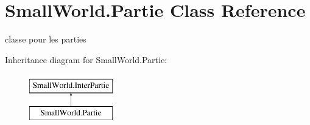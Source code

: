 \hypertarget{class_small_world_1_1_partie}{\section{Small\-World.\-Partie Class Reference}
\label{class_small_world_1_1_partie}
}


classe pour les parties  


Inheritance diagram for Small\-World.\-Partie\-:\begin{figure}[H]
\begin{center}
\leavevmode
\includegraphics[height=2.000000cm]{class_small_world_1_1_partie}
\end{center}
\end{figure}
